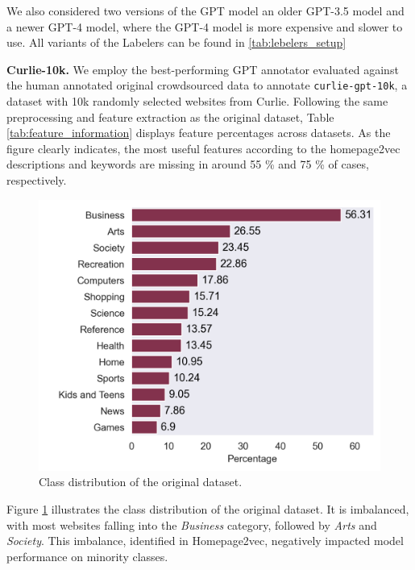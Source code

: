 We also considered two versions of the GPT model an older GPT-3.5 model and a newer GPT-4 model, where the GPT-4 model is more expensive and slower to use.
All variants of the Labelers can be found in \ref{tab:lebelers_setup}


\textbf{Curlie-10k.} 
We employ the best-performing GPT annotator evaluated against the human annotated original crowdsourced data to annotate \texttt{curlie-gpt-10k}, a dataset with 10k randomly selected websites from Curlie. 
Following the same preprocessing and feature extraction as the original dataset, Table \ref{tab:feature_information} displays feature percentages across datasets. 
As the figure clearly indicates, the most useful features according to the homepage2vec \cite{homepage2vec} descriptions and keywords are missing in around 55 \% and 75 \% of cases, respectively. 

\begin{figure}[!ht]
    \centering
    \includegraphics[width=1\columnwidth]{figures/category_distribution.png}
    \caption{Class distribution of the original dataset.}
    \label{fig:class_distribution}
\end{figure}

Figure \ref{fig:class_distribution} illustrates the class distribution of the original dataset. It is imbalanced, with most websites falling into the \textit{Business} category, followed by \textit{Arts} and \textit{Society}. This imbalance, identified in Homepage2vec, negatively impacted model performance on minority classes.


